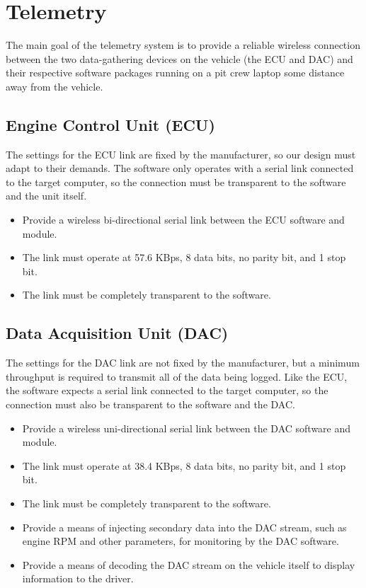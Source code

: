 \section{Telemetry}

The main goal of the telemetry system is to provide a reliable wireless connection between the two data-gathering devices on the vehicle (the ECU and DAC) and their respective software packages running on a pit crew laptop some distance away from the vehicle. 

\subsection{Engine Control Unit (ECU)}

The settings for the ECU link are fixed by the manufacturer, so our design must adapt to their demands. The software only operates with a serial link connected to the target computer, so the connection must be transparent to the software and the unit itself.

\begin{itemize}

\item Provide a wireless bi-directional serial link between the ECU software and module.
\item The link must operate at 57.6 KBps, 8 data bits, no parity bit, and 1 stop bit.
\item The link must be completely transparent to the software.

\end{itemize}

\subsection{Data Acquisition Unit (DAC)}

The settings for the DAC link are not fixed by the manufacturer, but a minimum throughput is required to transmit all of the data being logged. Like the ECU, the software expects a serial link connected to the target computer, so the connection must also be transparent to the software and the DAC.

\begin{itemize}

\item Provide a wireless uni-directional serial link between the DAC software and module.
\item The link must operate at 38.4 KBps, 8 data bits, no parity bit, and 1 stop bit.
\item The link must be completely transparent to the software.
\item Provide a means of injecting secondary data into the DAC stream, such as engine RPM and other parameters, for monitoring by the DAC software.
\item Provide a means of decoding the DAC stream on the vehicle itself to display information to the driver.

\end{itemize}

